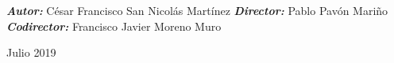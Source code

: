 \documentclass[
11pt, %
spanish, %
singlespacing, %
parskip, %
headsepline, %
]{MastersDoctoralThesis} %
\let\\\space%
\begin{document}
\begin{titlepage}
\begin{flushleft}
		\begin{large}
              \textit{\textbf{Autor:}} César Francisco San Nicolás Martínez\\
			  \textit{\textbf{Director:}} Pablo Pavón Mariño\\
			  \textit{\textbf{Codirector:}} Francisco Javier Moreno Muro\\
		\end{large}
	\end{flushleft}
	\vspace*{0.7in}
	\begin{center}
		Julio 2019\\
	\end{center}
    \vfill
	
\end{titlepage}
\restoregeometry
\cleardoublepage
\end{document}
